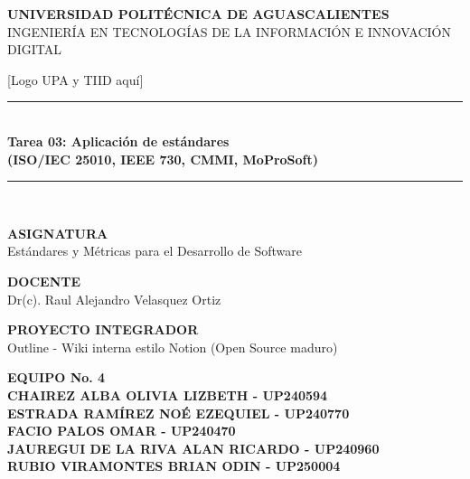 \documentclass[12pt]{article}
\begin{document}
\begin{titlepage}
    \thispagestyle{empty}
    \begin{center}
        \textsc{\Large {\textbf{UNIVERSIDAD POLITÉCNICA DE AGUASCALIENTES}}}\\
        {\Large \uppercase{Ingeniería en Tecnologías de la Información e Innovación Digital} \\[1cm] }

        \begin{center}
            [Logo UPA y TIID aquí]
        \end{center}

        \vspace{0.5cm}
        \rule{\linewidth}{0.3mm} \\
        { \Huge \bfseries Tarea 03: Aplicación de estándares\\[0.2cm]
          \large (ISO/IEC 25010, IEEE 730, CMMI, MoProSoft) }
        \rule{\linewidth}{0.3mm} \\

        \vspace{0.8cm}

        {\large \textbf{ASIGNATURA}}\\
        Estándares y Métricas para el Desarrollo de Software\\

        \vspace{0.4cm}

        {\large \textbf{DOCENTE}}\\
        Dr(c). Raul Alejandro Velasquez Ortiz \\

        \vspace{0.4cm}

        {\large \textbf{PROYECTO INTEGRADOR}}\\
        Outline - Wiki interna estilo Notion (Open Source maduro) \\

        \vspace{0.4cm}

        {\large \textbf{EQUIPO No. 4}}\\
        \vspace{0.4cm}
        \textbf{CHAIREZ ALBA OLIVIA LIZBETH - UP240594} \\
        \textbf{ESTRADA RAMÍREZ NOÉ EZEQUIEL - UP240770} \\
        \textbf{FACIO PALOS OMAR - UP240470} \\
        \textbf{JAUREGUI DE LA RIVA ALAN RICARDO - UP240960} \\
        \textbf{RUBIO VIRAMONTES BRIAN ODIN - UP250004}


\end{center}
\end{titlepage}
\end{document}
